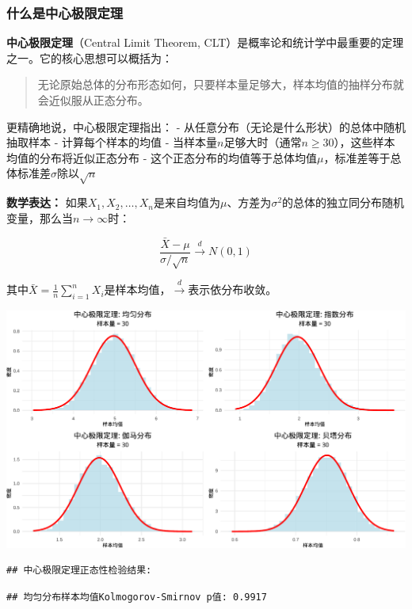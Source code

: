 \documentclass[
]{book}
\begin{document}
\hypertarget{ux4ec0ux4e48ux662fux4e2dux5fc3ux6781ux9650ux5b9aux7406}{%
\subsubsection{什么是中心极限定理}\label{ux4ec0ux4e48ux662fux4e2dux5fc3ux6781ux9650ux5b9aux7406}}

\textbf{中心极限定理}（Central Limit Theorem, CLT）是概率论和统计学中最重要的定理之一。它的核心思想可以概括为：

\begin{quote}
无论原始总体的分布形态如何，只要样本量足够大，样本均值的抽样分布就会近似服从正态分布。
\end{quote}

更精确地说，中心极限定理指出：
- 从任意分布（无论是什么形状）的总体中随机抽取样本
- 计算每个样本的均值
- 当样本量\(n\)足够大时（通常\(n \geq 30\)），这些样本均值的分布将近似正态分布
- 这个正态分布的均值等于总体均值\(\mu\)，标准差等于总体标准差\(\sigma\)除以\(\sqrt{n}\)

\textbf{数学表达：}
如果\(X_1, X_2, \ldots, X_n\)是来自均值为\(\mu\)、方差为\(\sigma^2\)的总体的独立同分布随机变量，那么当\(n \to \infty\)时：

\[\frac{\bar{X} - \mu}{\sigma/\sqrt{n}} \xrightarrow{d} N(0, 1)\]

其中\(\bar{X} = \frac{1}{n}\sum_{i=1}^n X_i\)是样本均值，\(\xrightarrow{d}\)表示依分布收敛。

\begin{center}\includegraphics[width=0.8\linewidth]{ecological-statistics_files/figure-latex/unnamed-chunk-32-1} \end{center}

\begin{verbatim}
## 中心极限定理正态性检验结果:
\end{verbatim}

\begin{verbatim}
## 均匀分布样本均值Kolmogorov-Smirnov p值: 0.9917
\end{verbatim}
\end{document}
